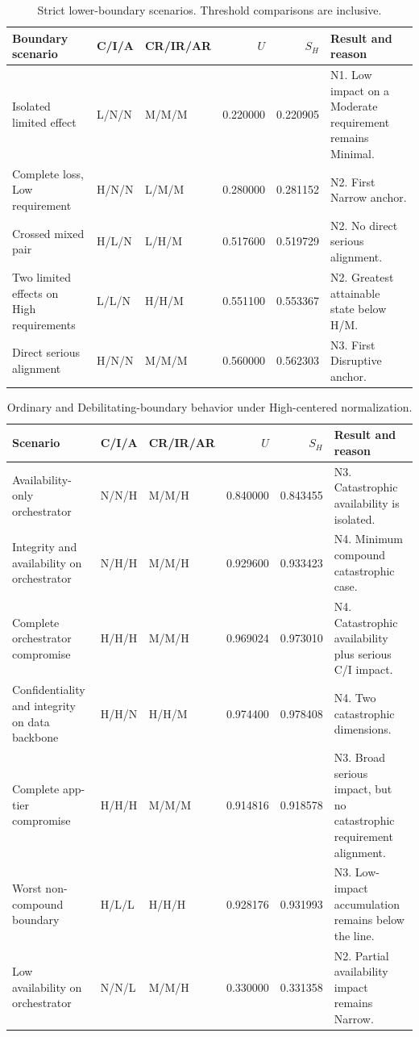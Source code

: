 \documentclass[11pt]{article}
\begin{document}
\begin{table}[H]
\centering
\footnotesize
\renewcommand{\arraystretch}{1.16}
\setlength{\tabcolsep}{4pt}
\begin{tabularx}{0.98\textwidth}{@{}P{0.21\textwidth}P{0.08\textwidth}P{0.12\textwidth}rrY@{}}
\toprule
\textbf{Boundary scenario} & \textbf{C/I/A} & \textbf{CR/IR/AR} & \textbf{$U$} & \textbf{$S_H$} & \textbf{Result and reason} \\
\midrule
Isolated limited effect & L/N/N & M/M/M & 0.220000 & 0.220905 & N1. Low impact on a Moderate requirement remains Minimal. \\
Complete loss, Low requirement & H/N/N & L/M/M & 0.280000 & 0.281152 & N2. First Narrow anchor. \\
Crossed mixed pair & H/L/N & L/H/M & 0.517600 & 0.519729 & N2. No direct serious alignment. \\
Two limited effects on High requirements & L/L/N & H/H/M & 0.551100 & 0.553367 & N2. Greatest attainable state below H/M. \\
Direct serious alignment & H/N/N & M/M/M & 0.560000 & 0.562303 & N3. First Disruptive anchor. \\
\bottomrule
\end{tabularx}
\caption{Strict lower-boundary scenarios. Threshold comparisons are inclusive.}
\label{tab:lower-boundaries}
\end{table}

\begin{table}[H]
\centering
\footnotesize
\renewcommand{\arraystretch}{1.18}
\setlength{\tabcolsep}{4pt}
\begin{tabularx}{0.98\textwidth}{@{}P{0.20\textwidth}P{0.08\textwidth}P{0.12\textwidth}rrY@{}}
\toprule
\textbf{Scenario} & \textbf{C/I/A} & \textbf{CR/IR/AR} & \textbf{$U$} & \textbf{$S_H$} & \textbf{Result and reason} \\
\midrule
Availability-only orchestrator & N/N/H & M/M/H & 0.840000 & 0.843455 & N3. Catastrophic availability is isolated. \\
Integrity and availability on orchestrator & N/H/H & M/M/H & 0.929600 & 0.933423 & N4. Minimum compound catastrophic case. \\
Complete orchestrator compromise & H/H/H & M/M/H & 0.969024 & 0.973010 & N4. Catastrophic availability plus serious C/I impact. \\
Confidentiality and integrity on data backbone & H/H/N & H/H/M & 0.974400 & 0.978408 & N4. Two catastrophic dimensions. \\
Complete app-tier compromise & H/H/H & M/M/M & 0.914816 & 0.918578 & N3. Broad serious impact, but no catastrophic requirement alignment. \\
Worst non-compound boundary & H/L/L & H/H/H & 0.928176 & 0.931993 & N3. Low-impact accumulation remains below the line. \\
Low availability on orchestrator & N/N/L & M/M/H & 0.330000 & 0.331358 & N2. Partial availability impact remains Narrow. \\
\bottomrule
\end{tabularx}
\caption{Ordinary and Debilitating-boundary behavior under High-centered normalization.}
\label{tab:scenarios}
\end{table}
\end{document}
